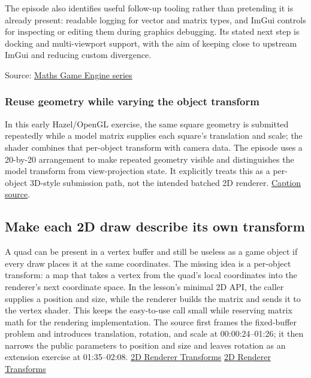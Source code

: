 The episode also identifies useful follow-up tooling rather than pretending it is already present: readable logging for vector and matrix types, and ImGui controls for inspecting or editing them during graphics debugging. Its stated next step is docking and multi-viewport support, with the aim of keeping close to upstream ImGui and reducing custom divergence.

Source: \href{https://www.youtube.com/watch?v=Idr1G1KyPNg}{Maths \textbar{} Game Engine series}

\subsubsection{Reuse geometry while varying the object transform}\label{06-engine-ii-ch025-reuse-geometry-while-varying-the-object-transform}

In this early Hazel/OpenGL exercise, the same square geometry is submitted repeatedly while a model matrix supplies each square's translation and scale; the shader combines that per-object transform with camera data. The episode uses a 20-by-20 arrangement to make repeated geometry visible and distinguishes the model transform from view-projection state. It explicitly treats this as a per-object 3D-style submission path, not the intended batched 2D renderer. \href{https://www.youtube.com/watch?v=cbB2fh0UxZ0}{Caption source}.

\subsection{Make each 2D draw describe its own transform}\label{06-engine-ii-ch025-make-each-2d-draw-describe-its-own-transform}

A quad can be present in a vertex buffer and still be useless as a game object if every draw places it at the same coordinates. The missing idea is a per-object transform: a map that takes a vertex from the quad's local coordinates into the renderer's next coordinate space. In the lesson's minimal 2D API, the caller supplies a position and size, while the renderer builds the matrix and sends it to the vertex shader. This keeps the easy-to-use call small while reserving matrix math for the rendering implementation. The source first frames the fixed-buffer problem and introduces translation, rotation, and scale at 00:00:24--01:26; it then narrows the public parameters to position and size and leaves rotation as an extension exercise at 01:35--02:08. \href{https://www.youtube.com/watch?v=-Qt12lcAF0Y&t=24s}{2D Renderer Transforms} \href{https://www.youtube.com/watch?v=-Qt12lcAF0Y&t=95s}{2D Renderer Transforms}

